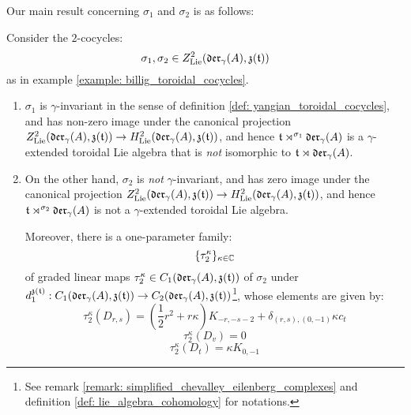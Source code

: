         Our main result concerning $\sigma_1$ and $\sigma_2$ is as follows:
        \begin{theorem} \label{theorem: billig_cocycle_main_theorem}
            Consider the $2$-cocycles:
                $$\sigma_1, \sigma_2 \in Z^2_{\mathrm{Lie}}(\mathfrak{der}_{\gamma}(A), \mathfrak{z}(\mathfrak{t}))$$
            as in example \ref{example: billig_toroidal_cocycles}.
            \begin{enumerate}
                \item $\sigma_1$ is $\gamma$-invariant in the sense of definition \ref{def: yangian_toroidal_cocycles}, and has non-zero image under the canonical projection $Z^2_{\mathrm{Lie}}(\mathfrak{der}_{\gamma}(A), \mathfrak{z}(\mathfrak{t})) \to H^2_{\mathrm{Lie}}(\mathfrak{der}_{\gamma}(A), \mathfrak{z}(\mathfrak{t}))$, and hence $\mathfrak{t} \rtimes^{\sigma_1} \mathfrak{der}_{\gamma}(A)$ is a $\gamma$-extended toroidal Lie algebra that is \textit{not} isomorphic to $\mathfrak{t} \rtimes \mathfrak{der}_{\gamma}(A)$.
                \item On the other hand, $\sigma_2$ is \textit{not} $\gamma$-invariant, and has zero image under the canonical projection $Z^2_{\mathrm{Lie}}(\mathfrak{der}_{\gamma}(A), \mathfrak{z}(\mathfrak{t})) \to H^2_{\mathrm{Lie}}(\mathfrak{der}_{\gamma}(A), \mathfrak{z}(\mathfrak{t}))$, and hence $\mathfrak{t} \rtimes^{\sigma_2} \mathfrak{der}_{\gamma}(A)$ is not a $\gamma$-extended toroidal Lie algebra.

                Moreover, there is a one-parameter family:
                    $$\{\tau_2^{\kappa}\}_{\kappa \in \mathbb{C}}$$
                of graded linear maps $\tau_2^{\kappa} \in C_1(\mathfrak{der}_{\gamma}(A), \mathfrak{z}(\mathfrak{t}))$ of $\sigma_2$ under $d_1^{\mathfrak{z}(\mathfrak{t})}: C_1(\mathfrak{der}_{\gamma}(A), \mathfrak{z}(\mathfrak{t})) \to C_2(\mathfrak{der}_{\gamma}(A), \mathfrak{z}(\mathfrak{t}))$\footnote{See remark \ref{remark: simplified_chevalley_eilenberg_complexes} and definition \ref{def: lie_algebra_cohomology} for notations.}, whose elements are given by:
                    $$\tau_2^{\kappa}(D_{r, s}) = \left( \frac12 r^2 + r\kappa \right) K_{-r, -s - 2} + \delta_{(r, s), (0, -1)} \kappa c_t$$
                    $$\tau_2^{\kappa}(D_v) = 0$$
                    $$\tau_2^{\kappa}(D_t) = \kappa K_{0, -1}$$
            \end{enumerate}
        \end{theorem}
